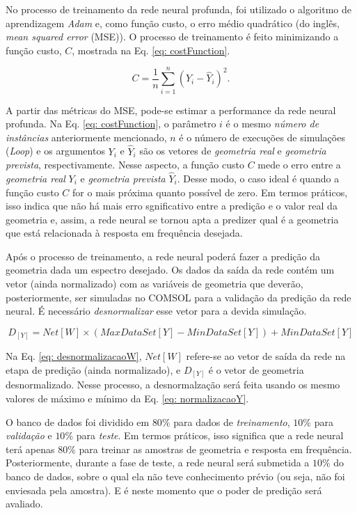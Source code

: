 No processo de treinamento da rede neural profunda, foi utilizado o algoritmo de aprendizagem \textit{Adam} e, como função custo, o erro médio quadrático (do inglês, \textit{mean squared error} (MSE)). O processo de treinamento é feito minimizando a função custo, $C$, mostrada na Eq. \ref{eq: costFunction}.

\begin{equation}
\label{eq: costFunction}
C = \frac{1}{n}\sum_{i=1}^{n}\left ( Y_{i} - \hat{Y}_{i} \right )^{2}.
\end{equation}

A partir das métricas do MSE, pode-se estimar a performance da rede neural profunda. Na Eq. \ref{eq: costFunction}, o parâmetro $i$ é o mesmo \textit{número de instâncias} anteriormente mencionado, $n$ é o número de execuções de simulações (\textit{Loop}) e os argumentos $Y_{i}$ e $\hat{Y}_{i}$ são os vetores de \textit{geometria real} e \textit{geometria prevista}, respectivamente. Nesse aspecto, a função custo $C$ mede o erro entre a \textit{geometria real} $Y_{i}$ e \textit{geometria prevista} $\hat{Y}_{i}$. Desse modo, o caso ideal é quando a função custo $C$ for o mais próxima quanto possível de zero. Em termos práticos, isso indica que não há mais erro sgnificativo entre a predição e o valor real da geometria e, assim, a rede neural se tornou apta a predizer qual é a geometria que está relacionada à resposta em frequência desejada.

Após o processo de treinamento, a rede neural poderá fazer a predição da geometria dada um espectro desejado. Os dados da saída da rede contém um vetor (ainda normalizado) com as variáveis de geometria que deverão, posteriormente, ser simuladas no COMSOL para a validação da predição da rede neural. É necessário \textit{desnormalizar} esse vetor para a devida simulação.

\begin{equation}
    \label{eq: desnormalizacaoW}
    D_{[Y]} = Net[W] \times \left ( MaxDataSet[Y] - MinDataSet[Y] \right ) + MinDataSet[Y]
\end{equation}

Na Eq. \ref{eq: desnormalizacaoW}, $Net[W]$ refere-se ao vetor de saída da rede na etapa de predição (ainda normalizado), e $D_{[Y]}$ é o vetor de geometria desnormalizado. Nesse processo, a desnormalzação será feita usando os mesmo valores de máximo e mínimo da Eq. \ref{eq: normalizacaoY}.

O banco de dados foi dividido em $80\%$ para dados de \textit{treinamento}, $10\%$ para \textit{validação} e $10\%$ para \textit{teste}. Em termos práticos, isso significa que a rede neural terá apenas $80\%$ para treinar as amostras de geometria e resposta em frequência. Posteriormente, durante a fase de teste, a rede neural será submetida a $10\%$ do banco de dados, sobre o qual ela não teve conhecimento prévio (ou seja, não foi enviesada pela amostra). E é neste momento que o poder de predição será avaliado.


